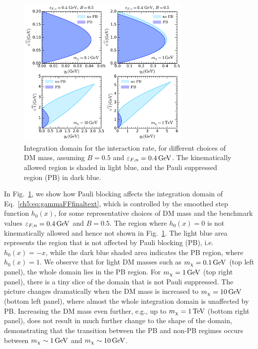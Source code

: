 \begin{figure}[t!bp] 
   \centering
   \includegraphics[width=0.75\textwidth]{capture_3/C_int_domain_mdm.pdf}
   \caption{Integration domain for the interaction rate, for different choices of DM mass, assuming   
     $B=0.5$ and $\varepsilon_{F,n}=0.4{\rm \,GeV}$. The kinematically allowed region is shaded in light blue, and the Pauli suppressed region (PB) in dark blue. 
   }
   \label{ch5:fig:intC}
   \end{figure}
   
   
In Fig.~\ref{ch5:fig:intC}, we show how Pauli blocking affects the integration domain of Eq.~\ref{ch5:eq:gammaFFfinaltext}, which is controlled by the smoothed step function $h_0(x)$, for some representative choices of DM mass and the benchmark values $\varepsilon_{F,n}=0.4{\rm \,GeV}$ and $B=0.5$.  The region where $h_0(x)=0$ is not kinematically allowed and hence not shown in Fig.~\ref{ch5:fig:intC}.
The light blue area represents the region that is not affected by Pauli blocking (PB), i.e. $h_0(x)=-x$, while the dark blue shaded area indicates the PB region, where $h_0(x)=1$. 
We observe that for light DM masses such as  $m_\chi=0.1{\rm \,GeV}$ (top left panel), the whole domain lies in the PB region. For $m_\chi=1{\rm \,GeV}$ (top right panel), there is a tiny slice of the domain that is not Pauli suppressed. The picture changes dramatically when the DM mass is increased to $m_\chi=10{\rm \,GeV}$ (bottom left panel), where almost the whole integration domain is unaffected by PB. Increasing the DM mass even further, e.g., up to $m_\chi=1{\rm \,TeV}$ (bottom right panel), does not result in much further change to the shape of the domain, demonstrating that the transition between the PB and non-PB regimes occurs between $m_\chi\sim1{\rm \,GeV}$ and $m_\chi\sim10{\rm \,GeV}$.
   


